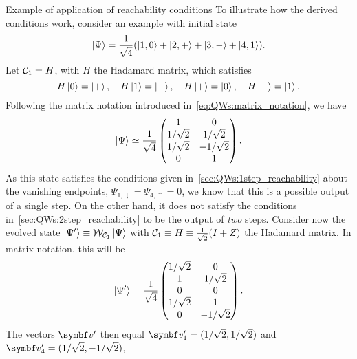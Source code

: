 \begin{examplebox}[label=ex:QWs:conditions_few_steps]{Example of application of reachability conditions}
    To illustrate how the derived conditions work, consider an example with initial state
    \begin{equation}
        \ket{\Psi} = \frac{1}{\sqrt4} (
        \ket{1,0} + \ket{2,+} + \ket{3, -} + \ket{4, 1}
        ).
    \end{equation}
    Let ${\mathcal{C}}_1=H$, with $H$ the Hadamard matrix, which satisfies
    \begin{equation}
        H\ket0=\ket+, \quad H\ket1=\ket-,
        \quad H\ket+=\ket0, \quad H\ket-=\ket1.
    \end{equation}
    Following the matrix notation introduced in~\cref{eq:QWs:matrix_notation}, we have
    \begin{equation}
        \ket{\Psi} \simeq
        \frac{1}{\sqrt4}
        \begin{pmatrix}
            1 & 0 \\
            1/\sqrt2 & 1/\sqrt2 \\
            1/\sqrt2 & -1/\sqrt2 \\
            0 & 1
        \end{pmatrix}.
    \end{equation}
    As this state satisfies the conditions given in~\cref{sec:QWs:1step_reachability} about the vanishing endpoints, $\Psi_{1,\downarrow}=\Psi_{4,\uparrow}=0$, we know that this is a possible output of a single step. On the other hand, it does not satisfy the conditions in~\cref{sec:QWs:2step_reachability} to be the output of \textit{two} steps.
    Consider now the evolved state $\ket{\Psi'}\equiv{\mathcal{W}}_{{\mathcal{C}}_1}\ket\Psi$ with ${\mathcal{C}}_1\equiv H\equiv\frac{1}{\sqrt2}(I+Z)$ the Hadamard matrix. In matrix notation, this will be
    \begin{equation}
        \ket{\Psi'} =
        \frac{1}{\sqrt4}
        \begin{pmatrix}
            1/\sqrt2 & 0 \\
            1 & 1/\sqrt2 \\ 
            0 & 0 \\
            1/\sqrt2 & 1 \\
            0 & -1/\sqrt2
        \end{pmatrix}.
        \label{eq:QWs:example_psi'}
    \end{equation}
    The vectors $\bs v'$ then equal $\bs v'_1=(1/\sqrt2, 1/\sqrt2)$ and
    $\bs v'_4=(1/\sqrt2, -1/\sqrt2)$,

\end{examplebox}
